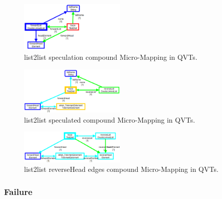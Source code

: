 \documentclass[conference]{IEEEtran}
\begin{document}


\begin{figure}[h]
	\centering
	\includegraphics[width=0.45\textwidth]{List2List-speculative-trace-QVTs.png}
	\caption{list2list speculation compound Micro-Mapping in QVTs.}
	\label{fig:List2List-speculative-trace-QVTs}
\end{figure}

\begin{figure}[h]
	\centering
	\includegraphics[width=0.45\textwidth]{List2List-reverseList-QVTs.png}
	\caption{list2list speculated compound Micro-Mapping in QVTs.}
	\label{fig:List2List-reverseList-QVTs}
\end{figure}

\begin{figure}[h]
	\centering
	\includegraphics[width=0.45\textwidth]{List2List-reverseHead-QVTs.png}
	\caption{list2list reverseHead edges compound Micro-Mapping in QVTs.}
	\label{fig:List2List-reverseHead-QVTs}
\end{figure}

\subsubsection{Failure}
\end{document}
